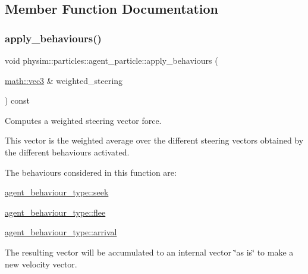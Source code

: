 \subsection{Member Function Documentation}
\mbox{\label{classphysim_1_1particles_1_1agent__particle_a8c43ad56e0b73e6795a287fb945da092}} 
\subsubsection{\texorpdfstring{apply\+\_\+behaviours()}{apply\_behaviours()}\hspace{0.1cm}{\footnotesize\ttfamily [1/2]}}
{\footnotesize\ttfamily void physim\+::particles\+::agent\+\_\+particle\+::apply\+\_\+behaviours (\begin{DoxyParamCaption}\item[{\hyperlink{structphysim_1_1math_1_1vec3}{math\+::vec3} \&}]{weighted\+\_\+steering }\end{DoxyParamCaption}) const}



Computes a weighted steering vector force. 

This vector is the weighted average over the different steering vectors obtained by the different behaviours activated.

The behaviours considered in this function are\+:
\begin{DoxyItemize}
\item \hyperlink{namespacephysim_1_1particles_a033757595f7862a0fc8a389d79bf9c88ae6f6362248805a36c61d205dbc6f4076}{agent\+\_\+behaviour\+\_\+type\+::seek}
\item \hyperlink{namespacephysim_1_1particles_a033757595f7862a0fc8a389d79bf9c88a918634f9410d3be95b2c6074f18cc62b}{agent\+\_\+behaviour\+\_\+type\+::flee}
\item \hyperlink{namespacephysim_1_1particles_a033757595f7862a0fc8a389d79bf9c88a0d4144ffc7e8e66a72800ea2b4101fd0}{agent\+\_\+behaviour\+\_\+type\+::arrival}
\end{DoxyItemize}

The resulting vector will be accumulated to an internal vector \char`\"{}as is\char`\"{} to make a new velocity vector.

